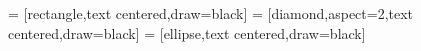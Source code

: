 


\usetikzlibrary{er}



 = [rectangle,text centered,draw=black]
 = [diamond,aspect=2,text centered,draw=black]
 = [ellipse,text centered,draw=black]
\newcommand{\foreignkey}{\ifmodulgeladen{icons}{\faLongArrowAltUp}{\uparrow}\,}
